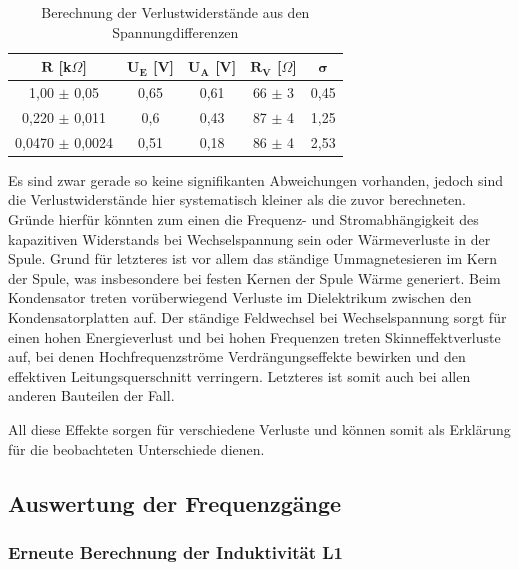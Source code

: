 \documentclass{article}
\begin{document}
\begin{table}[!h]
    \centering
    \begin{tabular}{ccccc}
        \hline
        $\bm{R}$ [k$\Omega$] & $\bm{U_E}$ [V] & $\bm{U_A}$ [V] & $\bm{R_V}$ [$\Omega$] & $\bm{\sigma}$  \\ \hline
         1,00 $\pm$ 0,05    & 0,65 & 0,61 &   66 $\pm$     3 &    0,45 \\
          0,220 $\pm$ 0,011    & 0,6  & 0,43 &   87 $\pm$     4 &    1,25 \\
           0,0470 $\pm$  0,0024 & 0,51 & 0,18 &   86 $\pm$     4 &    2,53 \\ \hline
    \end{tabular}%
    \caption{Berechnung der Verlustwiderstände aus den Spannungdifferenzen}
    \label{tab:A4-R_V2}
\end{table}

Es sind zwar gerade so keine signifikanten Abweichungen vorhanden, jedoch sind die Verlustwiderstände hier systematisch kleiner als die zuvor berechneten. Gründe hierfür könnten zum einen die Frequenz- und Stromabhängigkeit des kapazitiven Widerstands bei Wechselspannung sein oder Wärmeverluste in der Spule. Grund für letzteres ist vor allem das ständige Ummagnetesieren im Kern der Spule, was insbesondere bei festen Kernen der Spule Wärme generiert. Beim Kondensator treten vorüberwiegend Verluste im Dielektrikum zwischen den Kondensatorplatten auf. Der ständige Feldwechsel bei Wechselspannung sorgt für einen hohen Energieverlust und bei hohen Frequenzen treten Skinneffektverluste auf, bei denen Hochfrequenzströme Verdrängungseffekte bewirken und den effektiven Leitungsquerschnitt verringern. Letzteres ist somit auch bei allen anderen Bauteilen der Fall. 

All diese Effekte sorgen für verschiedene Verluste und können somit als Erklärung für die beobachteten Unterschiede dienen.   




\clearpage
\newpage

\subsection{Auswertung der Frequenzgänge}

\subsubsection{Erneute Berechnung der Induktivität L1}
\end{document}
